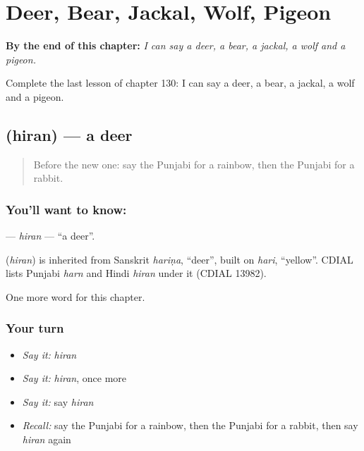
\chapter{Deer, Bear, Jackal, Wolf, Pigeon}
\label{ch:pa-deer-bear-jackal-wolf-pigeon}

\begin{chapteropening}
\textbf{By the end of this chapter:} \emph{I can say a deer, a bear, a jackal, a wolf and a pigeon.}

Complete the last lesson of chapter 130: I can say a deer, a bear, a jackal, a wolf and a pigeon.
\end{chapteropening}

\section[\texorpdfstring{\pa{ਹਿਰਨ} (hiran)}{ਹਿਰਨ (hiran)}]{ (hiran) — a deer}

\label{lesson:PA-C130-hiran}



\begin{quote}
Before the new one: say the Punjabi for a rainbow, then the Punjabi for a rabbit.
\end{quote}

\subsection*{You'll want to know: }
\textbf{} — \emph{hiran} — \textquotedblleft{}a deer\textquotedblright{}.

\begin{cousinweb}
\textbf{} (\emph{hiran}) is inherited from Sanskrit \emph{hariṇa}, \textquotedblleft{}deer\textquotedblright{}, built on \emph{hari}, \textquotedblleft{}yellow\textquotedblright{}. CDIAL lists Punjabi \emph{harn} and Hindi \emph{hiran} under it (CDIAL 13982).
\end{cousinweb}

\begin{grammarlens}[title={What you've built}]
One more word for this chapter.
\end{grammarlens}

\subsection*{Your turn}
\begin{itemize}
\raggedright
  \item \emph{Say it:} \emph{hiran}
  \item \emph{Say it:} \emph{hiran}, once more
  \item \emph{Say it:} say \emph{hiran}
  \item \emph{Recall:} say the Punjabi for a rainbow, then the Punjabi for a rabbit, then say \emph{hiran} again
\end{itemize}

